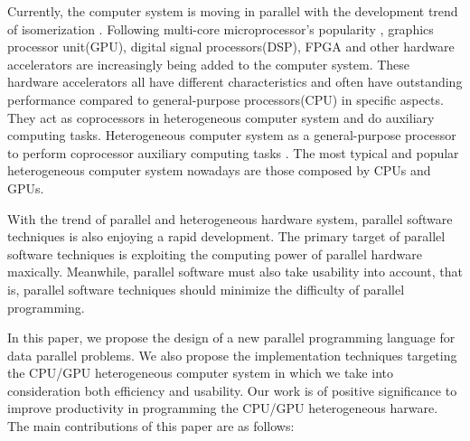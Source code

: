 \begin{eabstract}
Currently, the computer system is moving in parallel with the development trend of isomerization .
Following multi-core microprocessor's popularity ,
graphics processor unit(GPU), digital signal processors(DSP), FPGA and other hardware accelerators
are increasingly being added to the computer system.
These hardware accelerators all have different characteristics and 
often have outstanding performance compared to general-purpose processors(CPU) in specific aspects.
They act as coprocessors in heterogeneous computer system and do auxiliary computing tasks.
Heterogeneous computer system as a general-purpose processor to perform coprocessor auxiliary computing tasks .
The most typical and popular heterogeneous computer system nowadays are those composed by CPUs and GPUs.

With the trend of parallel and heterogeneous hardware system,
parallel software techniques is also enjoying a rapid development.
The primary target of parallel software techniques is exploiting the computing power of
parallel hardware maxically. Meanwhile, parallel software must also take usability
into account, that is, parallel software techniques should minimize the difficulty of parallel programming.

In this paper, we propose the design of a new parallel programming language for data parallel problems.
We also propose the implementation techniques targeting the CPU/GPU heterogeneous computer system in which
we take into consideration both efficiency and usability.
Our work is of positive significance to improve productivity in programming the CPU/GPU heterogeneous
harware. The main contributions of this paper are as follows:


\end{eabstract}
